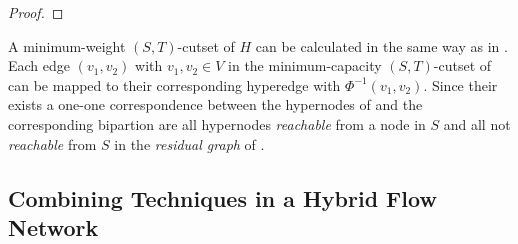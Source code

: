 \begin{proof}
\end{proof}

A minimum-weight $(S,T)$-cutset of $H$ can be calculated in  the same way as in
. Each edge $(v_1,v_2)$ with $v_1,v_2 \in V$ in the minimum-capacity
$(S,T)$-cutset of  can be mapped to their corresponding hyperedge
with $\Phi^{-1}(v_1,v_2)$. Since their exists a one-one correspondence between the hypernodes
of  and  the corresponding bipartion are all hypernodes \emph{reachable}
from a node in $S$ and all not \emph{reachable} from $S$ in the \emph{residual graph}
of . 

\subsection{Combining Techniques in a Hybrid Flow Network}
\label{sec:hybrid_network}

